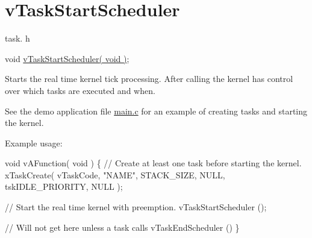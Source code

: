 \hypertarget{group__v_task_start_scheduler}{}\section{v\+Task\+Start\+Scheduler}
\label{group__v_task_start_scheduler}
task. h 
\begin{DoxyPre}void \hyperlink{task_8h_aaf9dca1065c60abdeb309d56ab7293cb}{vTaskStartScheduler( void )};\end{DoxyPre}


Starts the real time kernel tick processing. After calling the kernel has control over which tasks are executed and when.

See the demo application file \hyperlink{main_8c}{main.\+c} for an example of creating tasks and starting the kernel.

Example usage\+: 
\begin{DoxyPre}
void vAFunction( void )
\{
    // Create at least one task before starting the kernel.
    xTaskCreate( vTaskCode, "NAME", STACK\_SIZE, NULL, tskIDLE\_PRIORITY, NULL );\end{DoxyPre}



\begin{DoxyPre}    // Start the real time kernel with preemption.
    vTaskStartScheduler ();\end{DoxyPre}



\begin{DoxyPre}    // Will not get here unless a task calls vTaskEndScheduler ()
\}
  \end{DoxyPre}
 